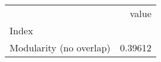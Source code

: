 \begin{tabular}{lr}
\toprule
{} &    value \\
Index                   &          \\
\midrule
Modularity (no overlap) &  0.39612 \\
\bottomrule
\end{tabular}
